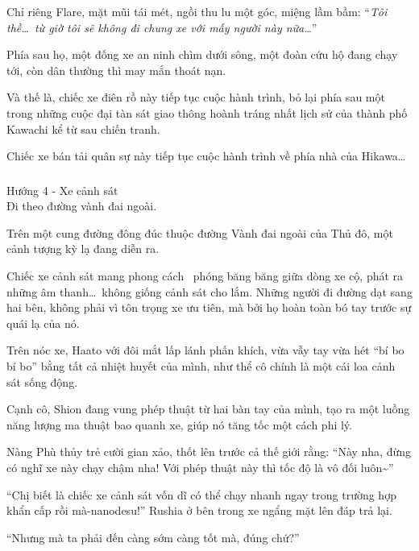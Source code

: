 \documentclass[../main.tex]{subfiles}
\begin{document}
Chỉ riêng Flare, mặt mũi tái mét, ngồi thu lu một góc, miệng lầm bầm: ``\textit{Tôi thề\dots\ từ giờ tôi sẽ không đi chung xe với mấy người này nữa\dots}''

Phía sau họ, một đống xe an ninh chìm dưới sông, một đoàn cứu hộ đang chạy tới, còn dân thường thì may mắn thoát nạn.

Và thế là, chiếc xe điên rồ này tiếp tục cuộc hành trình, bỏ lại phía sau một trong những cuộc đại tàn sát giao thông hoành tráng nhất lịch sử của thành phố Kawachi kể từ sau chiến tranh.

Chiếc xe bán tải quân sự này tiếp tục cuộc hành trình về phía nhà của Hikawa\dots

\subsubsection*{\label{P1.1d}}

\begin{center}
    {\color{T4} Hướng 4 - Xe cảnh sát}\\Đi theo đường vành đai ngoài.
\end{center}

Trên một cung đường đông đúc thuộc đường Vành đai ngoài của Thủ đô, một cảnh tượng kỳ lạ đang diễn ra.

Chiếc xe cảnh sát mang phong cách \hll\ phóng băng băng giữa dòng xe cộ, phát ra những âm thanh\dots\ không giống cảnh sát cho lắm. Những người đi đường dạt sang hai bên, không phải vì tôn trọng xe ưu tiên, mà bởi họ hoàn toàn bó tay trước sự quái lạ của nó.

Trên nóc xe, Haato với đôi mắt lấp lánh phấn khích, vừa vẫy tay vừa hét ``bí bo bí bo'' bằng tất cả nhiệt huyết của mình, như thể cô chính là một cái loa cảnh sát sống động.

Cạnh cô, Shion đang vung phép thuật từ hai bàn tay của mình, tạo ra một luồng năng lượng ma thuật bao quanh xe, giúp nó tăng tốc một cách phi lý.

Nàng Phù thủy trẻ cười gian xảo, thốt lên trước cả thế giới rằng: ``Này nha, đừng có nghĩ xe này chạy chậm nha! Với phép thuật này thì tốc độ là vô đối luôn\~{}''

``Chị biết là chiếc xe cảnh sát vốn dĩ có thể chạy nhanh ngay trong trường hợp khẩn cấp rồi mà-nanodesu!'' Rushia ở bên trong xe ngẩng mặt lên đáp trả lại.

``Nhưng mà ta phải đến càng sớm càng tốt mà, đúng chứ?''
\end{document}
